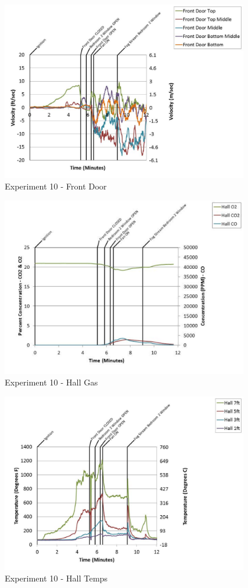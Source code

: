 \documentclass{article}
\begin{document}
\begin{appendices}
	\clearpage

	\begin{figure}[h!]
		\centering
		\includegraphics[height=3.05in]{0_Images/Results_Charts/Exp_10_Charts/FrontDoor.pdf}
		\caption{Experiment 10 - Front Door}
	\end{figure}
 

	\begin{figure}[h!]
		\centering
		\includegraphics[height=3.05in]{0_Images/Results_Charts/Exp_10_Charts/HallGas.pdf}
		\caption{Experiment 10 - Hall Gas}
	\end{figure}
 
	\clearpage

	\begin{figure}[h!]
		\centering
		\includegraphics[height=3.05in]{0_Images/Results_Charts/Exp_10_Charts/HallTemps.pdf}
		\caption{Experiment 10 - Hall Temps}
	\end{figure}
 


\end{appendices}
\end{document}
